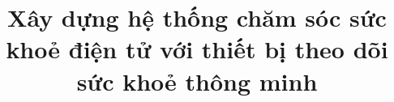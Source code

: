 \documentclass[oneside, final]{hcmut-report}
\title{Xây dựng hệ thống chăm sóc sức khoẻ điện tử với thiết bị theo dõi sức khoẻ thông minh}
\begin{document}
\coverpage

\tableofcontents
\newpage
\listoffigures
\newpage
\listoftables
\newpage

\clearpage






\renewcommand{\refname}{Tài liệu tham khảo}


\nocite{*}
\end{document}
